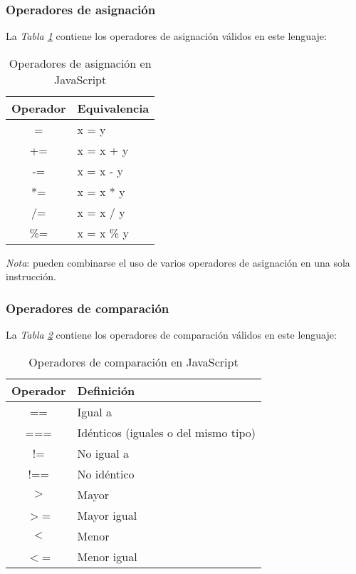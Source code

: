 \subsubsection{Operadores de asignación}
\hspace{0.55cm}La \textit{Tabla \ref{tab: 3}} contiene los operadores de asignación válidos en este lenguaje:
\begin{table}[H]
    \begin{center}
        \caption{Operadores de asignación en JavaScript}
        \label{tab: 3}
        \begin{tabular}{c l}
            \hline
            \textbf{Operador}&\textbf{Equivalencia} \\
            \hline
            = & x = y \\
            += & x = x + y \\
            -= & x = x - y \\
            *= & x = x * y \\
            /= & x = x / y \\
            \%= & x = x \% y \\
            \hline
        \end{tabular}
    \end{center}
\end{table}

\textit{Nota}: pueden combinarse el uso de varios operadores de asignación en una sola instrucción.


\subsubsection{Operadores de comparación}
\hspace{0.55cm}La \textit{Tabla \ref{tab: 4}} contiene los operadores de comparación válidos en este lenguaje:
\begin{table}[H]
    \begin{center}
        \caption{Operadores de comparación en JavaScript}
        \label{tab: 4}
        \begin{tabular}{c l}
            \hline
            \textbf{Operador}&\textbf{Definición} \\
            \hline
            == & Igual a \\
            === & Idénticos (iguales o del mismo tipo) \\
            != & No igual a \\
            !== & No idéntico \\
            $>$ & Mayor \\
            $>$= & Mayor igual \\
            $<$ & Menor \\
            $<$= & Menor igual \\
            \hline
        \end{tabular}
    \end{center}
\end{table}

